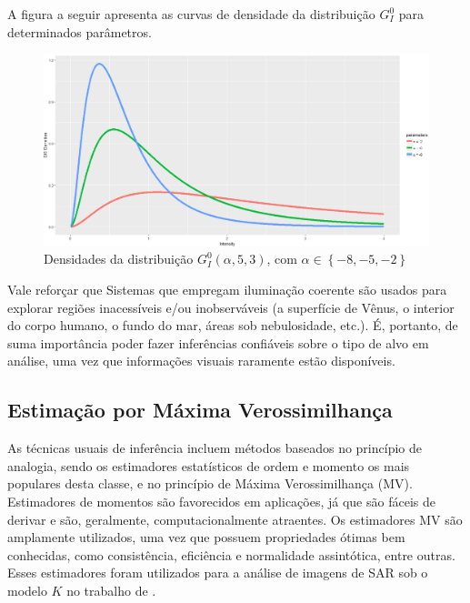 \documentclass[12pt]{article}
\begin{document}
A figura a seguir apresenta as curvas de densidade da distribuição $G_I^0$ para determinados parâmetros.
\begin{figure}[H]
     \centering
     \includegraphics[scale=0.5]{GI0Densities.png}
     \caption{Densidades da distribuição $G_I^0(\alpha, 5, 3)$, com $\alpha \in \left \{  -8, -5, -2 \right \}$}
     \label{graf_1}
\end{figure}

Vale reforçar que Sistemas que empregam iluminação coerente são usados para explorar regiões inacessíveis e/ou inobserváveis (a superfície de Vênus, o interior do corpo humano, o fundo do mar, áreas sob nebulosidade, etc.). É, portanto, de suma importância poder fazer inferências confiáveis sobre o tipo de alvo em análise, uma vez que informações visuais raramente estão disponíveis.


\subsection{Estimação por Máxima Verossimilhança}

As técnicas usuais de inferência incluem métodos baseados no princípio de analogia, sendo os estimadores estatísticos de ordem e momento os mais populares desta classe, e no princípio de Máxima Verossimilhança (MV). Estimadores de momentos são favorecidos em aplicações, já que são fáceis de derivar e são, geralmente, computacionalmente atraentes. Os estimadores MV são amplamente utilizados, uma vez que possuem propriedades ótimas bem conhecidas, como consistência, eficiência e normalidade assintótica, entre outras. Esses estimadores foram utilizados para a análise de imagens de SAR sob o modelo $K$ no trabalho de \citet{KMaxVer_Joughin}.
\end{document}
